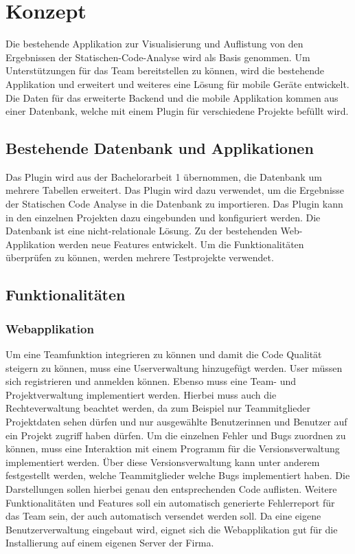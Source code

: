 \chapter{Konzept}
\label{chap:concept}
\chapterstart

Die bestehende Applikation zur Visualisierung und Auflistung von den Ergebnissen der Statischen-Code-Analyse wird als Basis genommen. Um Unterstützungen für das Team bereitstellen zu können, wird die bestehende Applikation und erweitert und weiteres eine Lösung für mobile Geräte entwickelt. Die Daten für das erweiterte Backend und die mobile Applikation kommen aus einer Datenbank, welche mit einem Plugin für verschiedene Projekte befüllt wird.

\section{Bestehende Datenbank und Applikationen}
Das Plugin wird aus der Bachelorarbeit 1 übernommen, die Datenbank um mehrere Tabellen erweitert. Das Plugin wird dazu verwendet, um die Ergebnisse der Statischen Code Analyse in die Datenbank zu importieren. Das Plugin kann in den einzelnen Projekten dazu eingebunden und konfiguriert werden. Die Datenbank ist eine nicht-relationale Lösung. Zu der bestehenden Web-Applikation werden neue Features entwickelt. Um die Funktionalitäten überprüfen zu können, werden mehrere Testprojekte verwendet. 

\section{Funktionalitäten}
\subsection{Webapplikation}
Um eine Teamfunktion integrieren zu können und damit die Code Qualität steigern zu können, muss eine Userverwaltung hinzugefügt werden. User müssen sich registrieren und anmelden können. Ebenso muss eine Team- und Projektverwaltung implementiert werden. Hierbei muss auch die Rechteverwaltung beachtet werden, da zum Beispiel nur Teammitglieder Projektdaten sehen dürfen und nur ausgewählte Benutzerinnen und Benutzer auf ein Projekt zugriff haben dürfen. Um die einzelnen Fehler und Bugs zuordnen zu können, muss eine Interaktion mit einem Programm für die Versionsverwaltung implementiert werden. Über diese Versionsverwaltung kann unter anderem festgestellt werden, welche Teammitglieder welche Bugs implementiert haben. Die Darstellungen sollen hierbei genau den entsprechenden Code auflisten. Weitere Funktionalitäten und Features soll ein automatisch generierte Fehlerreport für das Team sein, der auch automatisch versendet werden soll. Da eine eigene Benutzerverwaltung eingebaut wird, eignet sich die Webapplikation gut für die Installierung auf einem eigenen Server der Firma.

